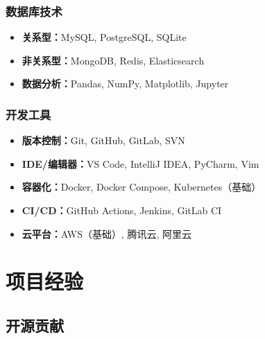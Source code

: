 \documentclass[a4paper,12pt]{article}
\begin{document}
\subsubsection{数据库技术}
\begin{itemize}
    \item \textbf{关系型：}MySQL, PostgreSQL, SQLite
    \item \textbf{非关系型：}MongoDB, Redis, Elasticsearch
    \item \textbf{数据分析：}Pandas, NumPy, Matplotlib, Jupyter
\end{itemize}

\subsubsection{开发工具}
\begin{itemize}
    \item \textbf{版本控制：}Git, GitHub, GitLab, SVN
    \item \textbf{IDE/编辑器：}VS Code, IntelliJ IDEA, PyCharm, Vim
    \item \textbf{容器化：}Docker, Docker Compose, Kubernetes（基础）
    \item \textbf{CI/CD：}GitHub Actions, Jenkins, GitLab CI
    \item \textbf{云平台：}AWS（基础）, 腾讯云, 阿里云
\end{itemize}

\section{项目经验}

\subsection{开源贡献}
\end{document}
